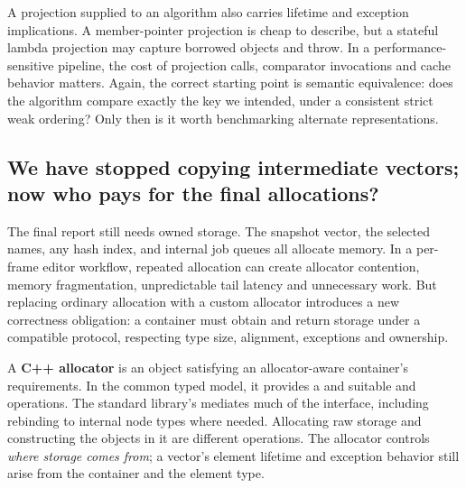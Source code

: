 A projection supplied to an algorithm also carries lifetime and exception implications. A member-pointer projection is cheap to describe, but a stateful lambda projection may capture borrowed objects and throw. In a performance-sensitive pipeline, the cost of projection calls, comparator invocations and cache behavior matters. Again, the correct starting point is semantic equivalence: does the algorithm compare exactly the key we intended, under a consistent strict weak ordering? Only then is it worth benchmarking alternate representations.

\subsection{We have stopped copying intermediate vectors; now who pays for the final allocations?}\label{05-engine-i-ch006-we-have-stopped-copying-intermediate-vectors-now-who-pays-for-the-final-allocations}

\hypertarget{05-engine-i-ch006-we-have-stopped-copying-intermediate-vectors-now-who-pays-for-the-final-allocations}{}

The final report still needs owned storage. The snapshot vector, the selected names, any hash index, and internal job queues all allocate memory. In a per-frame editor workflow, repeated allocation can create allocator contention, memory fragmentation, unpredictable tail latency and unnecessary work. But replacing ordinary allocation with a custom allocator introduces a new correctness obligation: a container must obtain and return storage under a compatible protocol, respecting type size, alignment, exceptions and ownership.

A \textbf{C++ allocator} is an object satisfying an allocator-aware container's requirements. In the common typed model, it provides a  and suitable  and  operations. The standard library's  mediates much of the interface, including rebinding to internal node types where needed. Allocating raw storage and constructing the objects in it are different operations. The allocator controls \emph{where storage comes from}; a vector's element lifetime and exception behavior still arise from the container and the element type.

